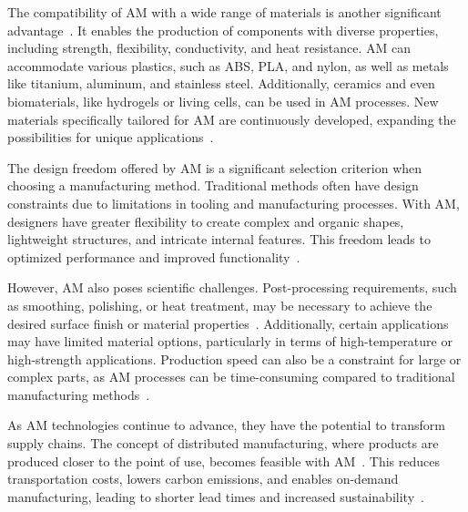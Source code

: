 The compatibility of AM with a wide range of materials is another significant advantage~\cite{Bose.2018}. It enables the production of components with diverse properties, including strength, flexibility, conductivity, and heat resistance. AM can accommodate various plastics, such as ABS, PLA, and nylon, as well as metals like titanium, aluminum, and stainless steel. Additionally, ceramics and even biomaterials, like hydrogels or living cells, can be used in AM processes. New materials specifically tailored for AM are continuously developed,  expanding the possibilities for unique applications~\cite{Attaran.2017}.

The design freedom offered by AM is a significant selection criterion when choosing a manufacturing method. Traditional methods often have design constraints due to limitations in tooling and manufacturing processes. With AM, designers have greater flexibility to create complex and organic shapes, lightweight structures, and intricate internal features. This freedom leads to optimized performance and improved functionality~\cite{Plocher.2019}.

However, AM also poses scientific challenges. Post-processing requirements, such as smoothing, polishing, or heat treatment, may be necessary to achieve the desired surface finish or material properties~\cite{Jandyal.2022}. Additionally, certain applications may have limited material options, particularly in terms of high-temperature or high-strength applications. Production speed can also be a constraint for large or complex parts, as AM processes can be time-consuming compared to traditional manufacturing methods~\cite{Dilberoglu.2017}.


As AM technologies continue to advance, they have the potential to transform supply chains. The concept of distributed manufacturing, where products are produced closer to the point of use, becomes feasible with AM~\cite{Jandyal.2022}. This reduces transportation costs, lowers carbon emissions, and enables on-demand manufacturing, leading to shorter lead times and increased sustainability~\cite{Haleem.2019}.

